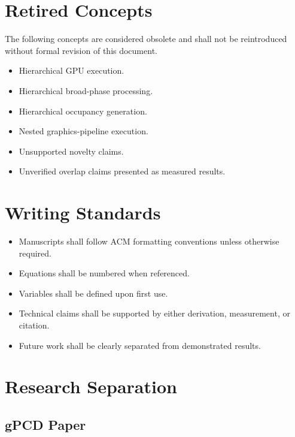 \section{Retired Concepts}
\label{sec:retired_concepts}

The following concepts are considered obsolete and shall not be reintroduced
without formal revision of this document.

\begin{itemize}
\item Hierarchical GPU execution.
\item Hierarchical broad-phase processing.
\item Hierarchical occupancy generation.
\item Nested graphics-pipeline execution.
\item Unsupported novelty claims.
\item Unverified overlap claims presented as measured results.
\end{itemize}

\section{Writing Standards}

\begin{itemize}
\item Manuscripts shall follow ACM formatting conventions unless otherwise required.
\item Equations shall be numbered when referenced.
\item Variables shall be defined upon first use.
\item Technical claims shall be supported by either derivation, measurement, or citation.
\item Future work shall be clearly separated from demonstrated results.
\end{itemize}

\section{Research Separation}

\subsection{gPCD Paper}

